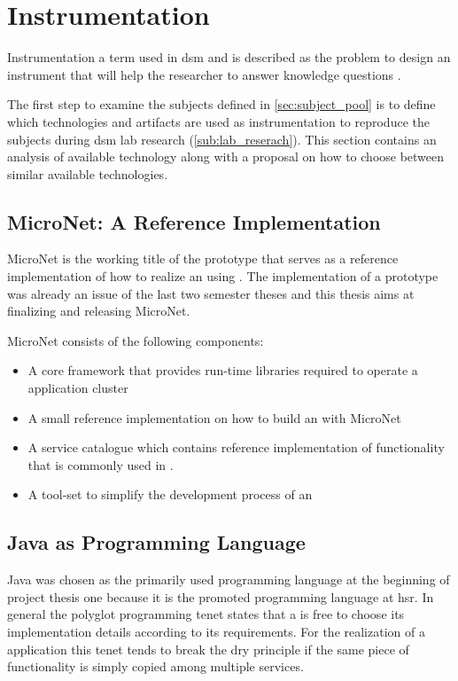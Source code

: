\section{Instrumentation}
\label{sub:instrumentation}

Instrumentation a term used in \gls{dsm} and is described as the problem to
design an instrument that will help the researcher to answer knowledge
questions \cite{wieringa2014design_science}.

The first step to examine the subjects defined in \autoref{sec:subject_pool} is
to define which technologies and artifacts are used as instrumentation to
reproduce the subjects during \gls{dsm} lab research
(\autoref{sub:lab_reserach}). This section contains an analysis of available
technology along with a proposal on how to choose between similar available
technologies.

\subsection{MicroNet: A Reference Implementation}

MicroNet is the working title of the prototype that serves as a reference
implementation of how to realize an \og{} using \mss{}. The implementation of a
prototype was already an issue of the last two semester theses and this thesis
aims at finalizing and releasing MicroNet.

MicroNet consists of the following components:

\begin{itemize}
  \item A core framework that provides run-time libraries required to operate a
  \ms{} \og{} application cluster
  \item A small reference implementation on how to build an \og{} with MicroNet
  \item A service catalogue which contains reference implementation of
  functionality that is commonly used in \ogs{}.
  \item A tool-set to simplify the development process of an \og{} 
\end{itemize}

\subsection{Java as Programming Language}

Java was chosen as the primarily used programming language at the beginning of
project thesis one because it is the promoted programming language at \gls{hsr}.
In general the polyglot programming tenet states that a \ms{} is free to choose
its implementation details according to its requirements. For the realization of
a \ms{} application this tenet tends to break the \gls{dry} principle if the
same piece of functionality is simply copied among multiple services.

